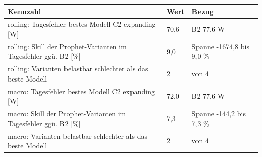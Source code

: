 \begin{tabular}{lll}
\toprule
Kennzahl & Wert & Bezug \\
\midrule
rolling: Tagesfehler bestes Modell C2 expanding [W] & 70,6 & B2 77,6 W \\
rolling: Skill der Prophet-Varianten im Tagesfehler ggü. B2 [\%] & 9,0 & Spanne -1674,8 bis 9,0 \% \\
rolling: Varianten belastbar schlechter als das beste Modell & 2 & von 4 \\
macro: Tagesfehler bestes Modell C2 expanding [W] & 72,0 & B2 77,6 W \\
macro: Skill der Prophet-Varianten im Tagesfehler ggü. B2 [\%] & 7,3 & Spanne -144,2 bis 7,3 \% \\
macro: Varianten belastbar schlechter als das beste Modell & 2 & von 4 \\
\bottomrule
\end{tabular}
